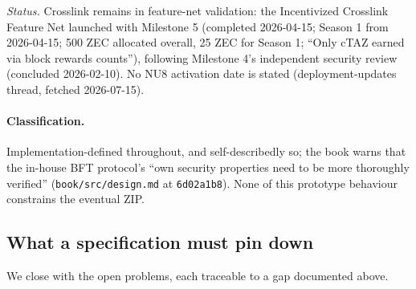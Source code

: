 \documentclass[11pt,a4paper]{article}
\theoremstyle{definition}
\begin{document}
\emph{Status.} Crosslink remains in feature-net validation: the
Incentivized Crosslink Feature Net launched with Milestone 5 (completed
2026-04-15; Season 1 from 2026-04-15; 500 ZEC allocated overall, 25 ZEC
for Season 1; ``Only cTAZ earned via block rewards counts''), following
Milestone 4's independent security review (concluded 2026-02-10). No NU8
activation date is stated (deployment-updates thread, fetched
2026-07-15).

\paragraph{Classification.} Implementation-defined throughout, and
self-describedly so; the book warns that the in-house BFT protocol's
``own security properties need to be more thoroughly verified''
(\texttt{book/src/design.md} at \texttt{6d02a1b8}). None of this
prototype behaviour constrains the eventual ZIP.

\subsection{What a specification must pin down}\label{sec:xl-stake-open}

We close with the open problems, each traceable to a gap documented
above.
\end{document}
